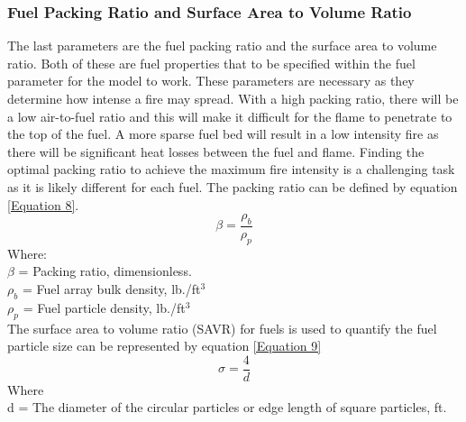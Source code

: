 \documentclass{article}
\begin{document}
 \subsubsection{Fuel Packing Ratio and Surface Area to Volume Ratio}
 \indent The last parameters are the fuel packing ratio and the surface area to volume ratio. Both of these are fuel properties that to be specified within the fuel parameter for the model to work. These parameters are necessary as they determine how intense a fire may spread. With a high packing ratio, there will be a low air-to-fuel ratio and this will make it difficult for the flame to penetrate to the top of the fuel. A more sparse fuel bed will result in a low intensity fire as there will be significant heat losses between the fuel and flame. Finding the optimal packing ratio to achieve the maximum fire intensity is a challenging task as it is likely different for each fuel. The packing ratio can be defined by equation \ref{Equation 8}.
 \begin{equation}
 	\beta = \frac {\rho _ b } {\rho _ p} 
 	\label{Equation 8}
 \end{equation}
Where: \\
$\beta$ = Packing ratio, dimensionless. \\
$\rho _ b$ = Fuel array bulk density, lb./ft$^3$ \\
$\rho _ p$ = Fuel particle density, lb./ft$^3$ \\

\indent The surface area to volume ratio (SAVR) for fuels is used to quantify the fuel particle size can be represented by equation \ref{Equation 9}
\begin{equation}
	\label{Equation 9}
	\sigma = \frac {4} {d} 
\end{equation}
 Where\\
 d = The diameter of the circular particles or edge length of square particles, ft.
\end{document}

